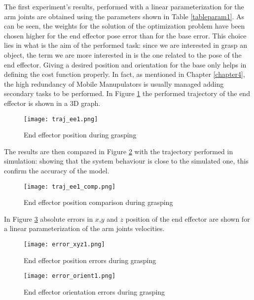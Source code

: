 The first experiment's results, performed with a linear parameterization for the arm joints are obtained using the parameters shown in Table \ref{tableparam1}. As can be seen, the weights for the solution of the optimization problem have been chosen higher for the end effector pose error than for the base error. This choice lies in what is the aim of the performed task: since we are interested in grasp an object, the term we are more interested in is the one related to the pose of the end effector. Giving a desired position and orientation for the base only helps in defining the cost function properly. In fact, as mentioned in Chapter \ref{chapter4}, the high redundancy of Mobile Manupulators is usually managed adding secondary tasks to be performed.
In Figure \ref{traj_ee1} the performed trajectory of the end effector is shown in a 3D graph. 
\begin{figure}[h!]
\centering
\texttt{[image: traj\_ee1.png]}
\caption{End effector position during grasping}
\label{traj_ee1}
\end{figure}
The results are then compared in Figure \ref{traj_ee1_comp} with the trajectory performed in simulation: showing that the system behaviour is close to the simulated one, this confirm the accuracy of the model. 
\begin{figure}[h!]
	\centering
	\texttt{[image: traj\_ee1\_comp.png]}
	\caption{End effector position comparison during grasping}
	\label{traj_ee1_comp}
\end{figure} 
In Figure \ref{error_xyz1} absolute errors in $x$,$y$ and $z$ position of the end effector are shown for a linear parameterization of the arm joints velocities.
\begin{figure}[h!]
\centering
\texttt{[image: error\_xyz1.png]}
\caption{End effector position errors during grasping}
\label{error_xyz1}
\end{figure}
\begin{figure}[h!]
\centering
\texttt{[image: error\_orient1.png]}
\caption{End effector orientation errors during grasping}
\label{error_orient1}
\end{figure}
